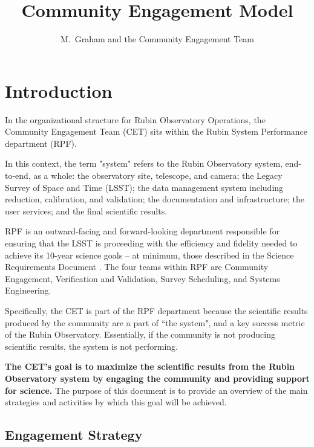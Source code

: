 \documentclass[DM,lsstdraft,toc]{lsstdoc}
\title{Community Engagement Model}
\author{%
M.~Graham and the Community Engagement Team
}
\date{\vcsDate}
\begin{document}
\maketitle



\section{Introduction}\label{sec:intro}

In the organizational structure for Rubin Observatory Operations, the Community Engagement Team (CET) sits within the Rubin System Performance department (RPF).

In this context, the term "system" refers to the Rubin Observatory system, end-to-end, as a whole: the observatory site, telescope, and camera; the Legacy Survey of Space and Time (LSST); the data management system including reduction, calibration, and validation; the documentation and infrastructure; the user services; and the final scientific results.

RPF is an outward-facing and forward-looking department responsible for ensuring that the LSST is proceeding with the efficiency and fidelity needed to achieve its 10-year science goals -- at minimum, those described in the Science Requirements Document .
The four teams within RPF are Community Engagement, Verification and Validation, Survey Scheduling, and Systems Engineering.

Specifically, the CET is part of the RPF department because the scientific results produced by the community are a part of ``the system", and a key success metric of the Rubin Observatory.
Essentially, if the community is not producing scientific results, the system is not performing. 

\textbf{The CET's goal is to maximize the scientific results from the Rubin Observatory system by engaging the community and providing support for science.}
The purpose of this document is to provide an overview of the main strategies and activities by which this goal will be achieved.


\subsection{Engagement Strategy}\label{ssec:intro_strat}
\end{document}
